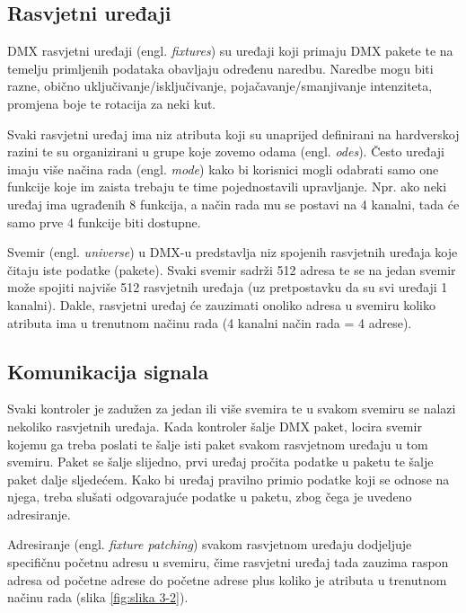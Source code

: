 \documentclass[times, utf8, zavrsni, numeric]{fer}
\begin{document}
\subsection{Rasvjetni uređaji}
DMX rasvjetni uređaji (engl. \emph{fixtures}) su uređaji koji primaju DMX pakete te na temelju primljenih podataka obavljaju određenu naredbu. Naredbe mogu biti razne, obično uključivanje/isključivanje, pojačavanje/smanjivanje intenziteta, promjena boje te rotacija za neki kut.\newline

Svaki rasvjetni uređaj ima niz atributa koji su unaprijed definirani na hardverskoj razini te su organizirani u grupe koje zovemo odama (engl. \emph{odes}). Često uređaji imaju više načina rada (engl. \emph{mode}) kako bi korisnici mogli odabrati samo one funkcije koje im zaista trebaju te time pojednostavili upravljanje. Npr. ako neki uređaj ima ugrađenih 8 funkcija, a način rada mu se postavi na 4 kanalni, tada će samo prve 4 funkcije biti dostupne.\newline

Svemir (engl. \emph{universe}) u DMX-u predstavlja niz spojenih rasvjetnih uređaja koje čitaju iste podatke (pakete). Svaki svemir sadrži 512 adresa te se na jedan svemir može spojiti najviše 512 rasvjetnih uređaja (uz pretpostavku da su svi uređaji 1 kanalni). Dakle, rasvjetni uređaj će zauzimati onoliko adresa u svemiru koliko atributa ima u trenutnom načinu rada (4 kanalni način rada = 4 adrese).

\subsection{Komunikacija signala}
Svaki kontroler je zadužen za jedan ili više svemira te u svakom svemiru se nalazi nekoliko rasvjetnih uređaja. Kada kontroler šalje DMX paket, locira svemir kojemu ga treba poslati te šalje isti paket svakom rasvjetnom uređaju u tom svemiru. Paket se šalje slijedno, prvi uređaj pročita podatke u paketu te šalje paket dalje sljedećem. Kako bi uređaj pravilno primio podatke koji se odnose na njega, treba slušati odgovarajuće podatke u paketu, zbog čega je uvedeno adresiranje.\newline

Adresiranje (engl. \emph{fixture patching}) svakom rasvjetnom uređaju dodjeljuje specifičnu početnu adresu u svemiru, čime rasvjetni uređaj tada zauzima raspon adresa od početne adrese do početne adrese plus koliko je atributa u trenutnom načinu rada (slika \ref{fig:slika 3-2}).
\end{document}
